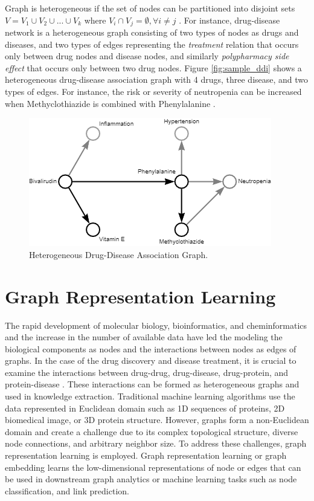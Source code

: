 Graph is heterogeneous if the set of nodes can be partitioned into disjoint sets $V = V_{1} \cup V_{2} \cup ... \cup V_{k} $ where $V_{i} \cap V_{j} = \emptyset , \forall i \neq j$ \cite{sun2013mining}. For instance, drug-disease network is a heterogeneous graph consisting of two types of nodes as drugs and diseases, and two types of edges representing the \textit{treatment} relation that occurs only between drug nodes and disease nodes, and similarly \textit{polypharmacy side effect} that occurs only between two drug nodes. Figure \ref{fig:sample_ddi} shows a heterogeneous drug-disease association graph with 4 drugs, three disease, and two types of edges. For instance, the risk or severity of neutropenia can be increased when Methyclothiazide is combined with Phenylalanine \cite{ruiz2022primary}. 

\begin{figure}
    \centering
        \includegraphics[width=0.65\linewidth]{chapters/background/figures/dda.png} 
    \caption{Heterogeneous Drug-Disease Association Graph.}
    \label{fig:sample_dda}
\end{figure}


\section{Graph Representation Learning}
The rapid development of molecular biology, bioinformatics, and cheminformatics and the increase in the number of available data have led the modeling the biological components as nodes and the interactions between nodes as edges of graphs. In the case of the drug discovery and disease treatment, it is crucial to examine the interactions between drug-drug, drug-disease, drug-protein, and protein-disease \cite{daminelli2012drug, davis2009comparative}. These interactions can be formed as heterogeneous graphs and used in knowledge extraction. Traditional machine learning algorithms use the data represented in Euclidean domain such as 1D sequences of proteins, 2D biomedical image, or 3D protein structure. However, graphs form a non-Euclidean domain and create a challenge due to its complex topological structure, diverse node connections, and arbitrary neighbor size. To address these challenges, graph representation learning is employed. Graph representation learning or graph embedding learns the low-dimensional representations of node or edges that can be used in downstream graph analytics or machine learning tasks such as node classification, and link prediction.

